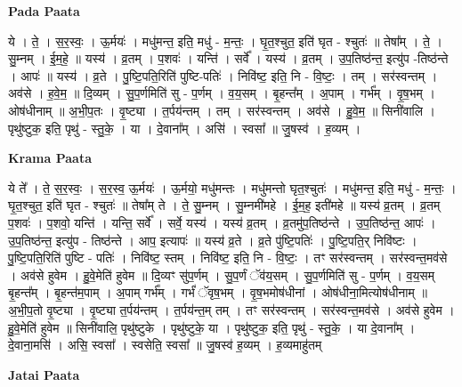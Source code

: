 \documentclass[17pt]{extarticle}
\begin{document}
\textbf{Pada Paata} \newline

ये । ते॒ । स॒र॒स्वः॒ । ऊ॒र्मयः॑ । मधु॑मन्त॒ इति॒ मधु॑ - म॒न्तः॒ । घृ॒त॒श्चुत॒ इति॑ घृत - श्चुतः॑ ॥ तेषा᳚म् । ते॒ । सु॒म्नम् । ई॒म॒हे॒ ॥ यस्य॑ । व्र॒तम् । प॒शवः॑ । यन्ति॑ । सर्वे᳚ । यस्य॑ । व्र॒तम् । उ॒प॒तिष्ठ॑न्त॒ इत्यु॑प -तिष्ठ॑न्ते । आपः॑ ॥ यस्य॑ । व्र॒ते । पु॒ष्टि॒पति॒रिति॑ पुष्टि-पतिः॑ । निवि॑ष्ट॒ इति॒ नि - वि॒ष्टः॒ । तम् । सर॑स्वन्तम् । अव॑से । ह॒वे॒म॒ ॥ दि॒व्यम् । सु॒प॒र्णमिति॑ सु - प॒र्णम् । व॒य॒सम् । बृ॒हन्त᳚म् । अ॒पाम् । गर्भ᳚म् । वृ॒ष॒भम् । ओष॑धीनाम् ॥ अ॒भी॒प॒तः । वृ॒ष्ट्या । त॒र्पय॑न्तम् । तम् । सर॑स्वन्तम् । अव॑से । हु॒वे॒म॒ ॥ सिनी॑वालि । पृथु॑ष्टुक॒ इति॒ पृथु॑ - स्तु॒के॒ । या । दे॒वाना᳚म् । असि॑ । स्वसा᳚ ॥ जु॒षस्व॑ । ह॒व्यम् ।  \newline


\textbf{Krama Paata} \newline

ये ते᳚ । ते॒ स॒र॒स्वः॒ । स॒र॒स्व॒ ऊ॒र्मयः॑ । ऊ॒र्मयो॒ मधु॑मन्तः । मधु॑मन्तो घृत॒श्चुतः॑ । मधु॑मन्त॒ इति॒ मधु॑ - म॒न्तः॒ । घृ॒त॒श्चुत॒ इति॑ घृत - श्चुतः॑ ॥ तेषा᳚म् ते । ते॒ सु॒म्नम् । सु॒म्नमी॑महे । ई॒म॒ह॒ इती॑महे ॥ यस्य॑ व्र॒तम् । व्र॒तम् प॒शवः॑ । प॒शवो॒ यन्ति॑ । यन्ति॒ सर्वे᳚ । सर्वे॒ यस्य॑ । यस्य॑ व्र॒तम् । व्र॒तमु॑प॒तिष्ठ॑न्ते । उ॒प॒तिष्ठ॑न्त॒ आपः॑ । उ॒प॒तिष्ठ॑न्त॒ इत्यु॑प - तिष्ठ॑न्ते । आप॒ इत्यापः॑ ॥ यस्य॑ व्र॒ते । व्र॒ते पु॑ष्टि॒पतिः॑ । पु॒ष्टि॒पति॒र् निवि॑ष्टः । पु॒ष्टि॒पति॒रिति॑ पुष्टि - पतिः॑ । निवि॑ष्ट॒ स्तम् । निवि॑ष्ट॒ इति॒ नि - वि॒ष्टः॒ । तꣳ सर॑स्वन्तम् । सर॑स्वन्त॒मव॑से । अव॑से हुवेम । हु॒वे॒मेति॑ हुवेम ॥ दि॒व्यꣳ सु॑प॒र्णम् । सु॒प॒र्णं ॅव॑य॒सम् । सु॒प॒र्णमिति॑ सु - प॒र्णम् । व॒य॒सम् बृ॒हन्त᳚म् । बृ॒हन्त॑म॒पाम् । अ॒पाम् गर्भ᳚म् । गर्भं॑ ॅवृष॒भम् । वृ॒ष॒भमोष॑धीनां । ओष॑धीना॒मित्योष॑धीनाम् ॥ अ॒भी॒प॒तो वृ॒ष्ट्या । वृ॒ष्ट्या त॒र्पय॑न्तम् । त॒र्पय॑न्त॒म् तम् । तꣳ सर॑स्वन्तम् । सर॑स्वन्त॒मव॑से । अव॑से हुवेम । हु॒वे॒मेति॑ हुवेम ॥ सिनी॑वालि॒ पृथु॑ष्टुके । पृथु॑ष्टुके॒ या । पृथु॑ष्टुक॒ इति॒ पृथु॑ - स्तु॒के॒ । या दे॒वाना᳚म् । दे॒वाना॒मसि॑ । असि॒ स्वसा᳚ । स्वसेति॒ स्वसा᳚ ॥ जु॒षस्व॑ ह॒व्यम् । ह॒व्यमाहु॑तम् \newline

\textbf{Jatai Paata} \newline
\end{document}
